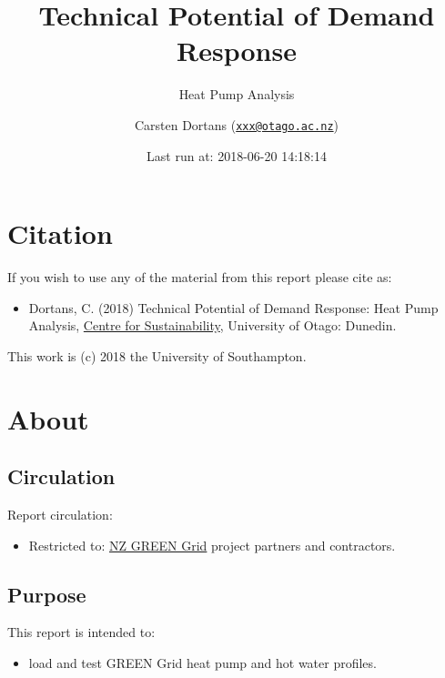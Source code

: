 \documentclass[]{article}
\title{Technical Potential of Demand Response}
\subtitle{Heat Pump Analysis}
\author{Carsten Dortans
(\href{mailto:xxx@otago.ac.nz}{\nolinkurl{xxx@otago.ac.nz}})}
\date{Last run at: 2018-06-20 14:18:14}
\providecommand{\tightlist}{%
  \setlength{\itemsep}{0pt}\setlength{\parskip}{0pt}}
\begin{document}
\maketitle

{
\setcounter{tocdepth}{2}
\tableofcontents
}
\newpage

\section{Citation}\label{citation}

If you wish to use any of the material from this report please cite as:

\begin{itemize}
\tightlist
\item
  Dortans, C. (2018) Technical Potential of Demand Response: Heat Pump
  Analysis, \href{http://www.otago.ac.nz/centre-sustainability/}{Centre
  for Sustainability}, University of Otago: Dunedin.
\end{itemize}

This work is (c) 2018 the University of Southampton.

\newpage

\section{About}\label{about}

\subsection{Circulation}\label{circulation}

Report circulation:

\begin{itemize}
\tightlist
\item
  Restricted to:
  \href{https://www.otago.ac.nz/centre-sustainability/research/energy/otago050285.html}{NZ
  GREEN Grid} project partners and contractors.
\end{itemize}

\subsection{Purpose}\label{purpose}

This report is intended to:

\begin{itemize}
\tightlist
\item
  load and test GREEN Grid heat pump and hot water profiles.
\end{itemize}
\end{document}
